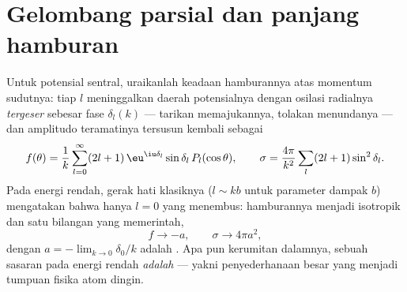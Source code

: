 \section{Gelombang parsial dan panjang hamburan}

\begin{theorem}\label{thm:b3:scattering-theory:partial}
Untuk potensial sentral, uraikanlah keadaan hamburannya atas momentum
sudutnya: tiap  $l$ meninggalkan daerah potensialnya
dengan osilasi radialnya \emph{tergeser} sebesar fase $\delta_l(k)$ ---
tarikan memajukannya, tolakan menundanya --- dan amplitudo teramatinya
tersusun kembali sebagai
\[
f(\theta) = \frac1k\sum_{l=0}^\infty(2l+1)\,\eu^{\iu\delta_l}
\sin\delta_l\,P_l(\cos\theta) , \qquad
\sigma = \frac{4\pi}{k^2}\sum_l(2l+1)\sin^2\delta_l .
\]
Pada energi rendah, gerak hati klasiknya ($l \sim kb$ untuk parameter
dampak $b$) mengatakan bahwa hanya $l = 0$ yang menembus: hamburannya
menjadi isotropik dan satu bilangan yang memerintah,
\[
f \to -a , \qquad \sigma \to 4\pi a^2 ,
\]
dengan $a = -\lim_{k\to0}\delta_0/k$ adalah \emph{}.
Apa pun kerumitan dalamnya, sebuah sasaran pada energi rendah
\emph{adalah}  --- yakni penyederhanaan besar yang
menjadi tumpuan fisika atom dingin.
\end{theorem}
\admitted

